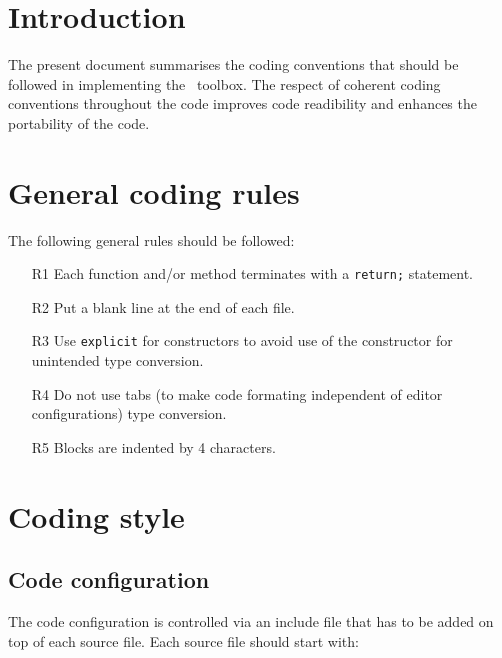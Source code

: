 \documentclass{article}[12pt,a4]
\begin{document}
\frontpage


\section{Introduction}

The present document summarises the coding conventions that should be
followed in implementing the \this\ toolbox.
The respect of coherent coding conventions throughout the code
improves code readibility and enhances the portability of the code.


\section{General coding rules}

The following general rules should be followed:
\begin{itemize}
\item[R1] Each function and/or method terminates with a {\tt return;} statement.
\item[R2] Put a blank line at the end of each file.
\item[R3] Use {\tt explicit} for constructors to avoid use of the constructor for unintended
type conversion.
\item[R4] Do not use tabs (to make code formating independent of editor configurations)
type conversion.
\item[R5] Blocks are indented by 4 characters.
\end{itemize}


\section{Coding style}

\subsection{Code configuration}

The code configuration is controlled via an include file that has to be added on top of
each source file.
Each source file should start with:
\end{document}
